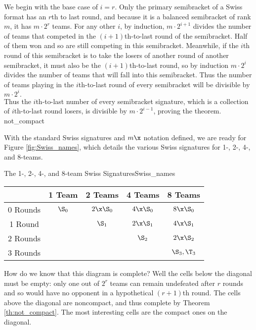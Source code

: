 {{        We begin with the base case of $i=r$. Only the primary semibracket of a Swiss format has an $r$th to last round, and because it is a balanced semibracket of rank $m$, it has $m \cdot 2^r$ teams. For any other $i$, by induction, $m \cdot 2^{i+1}$ divides the number of teams that competed in the $(i+1)$th-to-last round of the semibracket. Half of them won and so are still competing in this semibracket. Meanwhile, if the $i$th round of this semibracket is to take the losers of another round of another semibracket, it must also be the $(i+1)$th-to-last round, so by induction $m \cdot 2^{i}$ divides the number of teams that will fall into this semibracket. Thus the number of teams playing in the $i$th-to-last round of every semibracket will be divisible by $m \cdot 2^{i}.$\\
        
        Thus the $i$th-to-last number of every semibracket signature, which is a collection of $i$th-to-last round losers, is divisible by $m \cdot 2^{i-1}$, proving the theorem.
    }{not_compact}{\fried}


    With the standard Swiss signatures and $m\x$ notation defined, we are ready for Figure \ref{fig:Swiss_names}, which details the various Swiss signatures for 1-, 2-, 4-, and 8-teams.

    \begin{figg}{The 1-, 2-, 4-, and 8-team Swiss Signatures}{Swiss_names}
        \begin{center}
            \begin{tabular}{ c | c | c | c | c}
                & 1 Team & 2 Teams & 4 Teams & 8 Teams\\
                \hline
                0 Rounds & $\S_0$ & $2\x\S_0$ & $4\x\S_0$ & $8\x\S_0$\\
                \hline
                1 Round & & $\S_1$ & $2\x\S_1$ & $4\x\S_1$\\
                \hline
                2 Rounds & & & $\S_2$ & $2\x\S_2$\\
                \hline
                \multirow{1}{*}{3 Rounds} & & & &  $\S_3, \T_3$ \\
            \end{tabular}
        \end{center}
        \end{figg}

    How do we know that this diagram is complete? Well the cells below the diagonal must be empty: only one out of $2^r$ teams can remain undefeated after $r$ rounds and so would have no opponent in a hypothetical $(r+1)$th round. The cells above the diagonal are noncompact, and thus complete by Theorem \ref{th:not_compact}. The most interesting cells are the compact ones on the diagonal.

}
